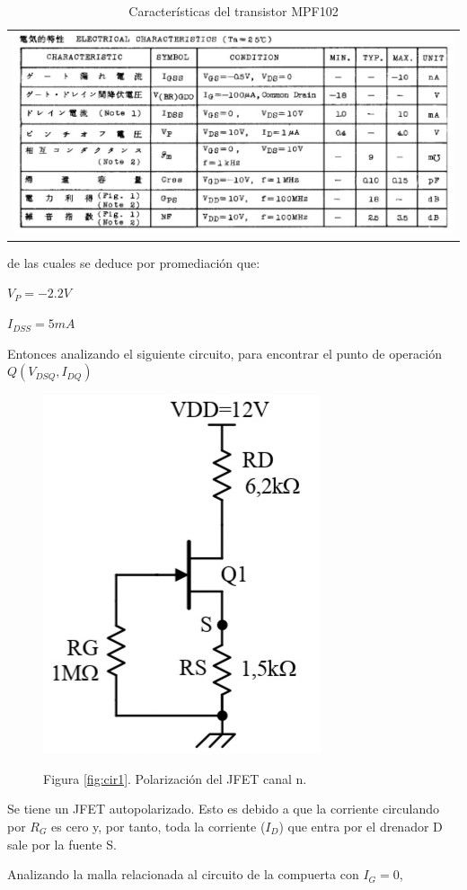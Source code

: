 \documentclass[12pt, a4paper]{article}
\begin{document}
    \begin{table}[h!]
        \centering
        \caption{Características del transistor MPF102} %
        \label{tab:K61-Y} %
        \begin{tabular}{c}
            \includegraphics[width=16cm\textwidth]{K61-Y.jpg} \\
        \end{tabular}
    \end{table}
    
    de las cuales se deduce por promediación que:

    $V_P = -2.2V$

    $I_{DSS} = 5mA$

    Entonces analizando el siguiente circuito, para encontrar el punto de operación $Q(V_{DSQ},I_{DQ})$

    \begin{figure}[h!]
        \centering
        \includegraphics[height=5cm\textwidth]{circuito1.jpg} \par
        Figura \ref{fig:cir1}. Polarización del JFET canal n.
    \end{figure}

    Se tiene un JFET autopolarizado. Esto es debido a que la corriente circulando por $R_G$ es cero y, por tanto, toda la corriente ($I_D$) que entra por el drenador D sale por la fuente S.

    Analizando la malla relacionada al circuito de la compuerta con $I_G = 0$,
\end{document}
